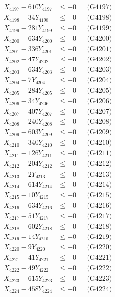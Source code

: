 \documentclass[a4paper,10pt]{article}
\begin{document}
{\begin{align}
X_{4197} - 610Y_{4197} &\leq +0 && \text{(G4197)} \\
X_{4198} - 34Y_{4198} &\leq +0 && \text{(G4198)} \\
X_{4199} - 281Y_{4199} &\leq +0 && \text{(G4199)} \\
X_{4200} - 634Y_{4200} &\leq +0 && \text{(G4200)} \\
\allowbreak
X_{4201} - 336Y_{4201} &\leq +0 && \text{(G4201)} \\
X_{4202} - 47Y_{4202} &\leq +0 && \text{(G4202)} \\
X_{4203} - 634Y_{4203} &\leq +0 && \text{(G4203)} \\
X_{4204} - 7Y_{4204} &\leq +0 && \text{(G4204)} \\
X_{4205} - 284Y_{4205} &\leq +0 && \text{(G4205)} \\
X_{4206} - 34Y_{4206} &\leq +0 && \text{(G4206)} \\
X_{4207} - 407Y_{4207} &\leq +0 && \text{(G4207)} \\
X_{4208} - 240Y_{4208} &\leq +0 && \text{(G4208)} \\
X_{4209} - 603Y_{4209} &\leq +0 && \text{(G4209)} \\
X_{4210} - 340Y_{4210} &\leq +0 && \text{(G4210)} \\
\allowbreak
X_{4211} - 126Y_{4211} &\leq +0 && \text{(G4211)} \\
X_{4212} - 204Y_{4212} &\leq +0 && \text{(G4212)} \\
X_{4213} - 2Y_{4213} &\leq +0 && \text{(G4213)} \\
X_{4214} - 614Y_{4214} &\leq +0 && \text{(G4214)} \\
X_{4215} - 10Y_{4215} &\leq +0 && \text{(G4215)} \\
X_{4216} - 634Y_{4216} &\leq +0 && \text{(G4216)} \\
X_{4217} - 51Y_{4217} &\leq +0 && \text{(G4217)} \\
X_{4218} - 602Y_{4218} &\leq +0 && \text{(G4218)} \\
X_{4219} - 14Y_{4219} &\leq +0 && \text{(G4219)} \\
X_{4220} - 9Y_{4220} &\leq +0 && \text{(G4220)} \\
\allowbreak
X_{4221} - 41Y_{4221} &\leq +0 && \text{(G4221)} \\
X_{4222} - 49Y_{4222} &\leq +0 && \text{(G4222)} \\
X_{4223} - 615Y_{4223} &\leq +0 && \text{(G4223)} \\
X_{4224} - 458Y_{4224} &\leq +0 && \text{(G4224)} \\

\end{align}}
\end{document}
